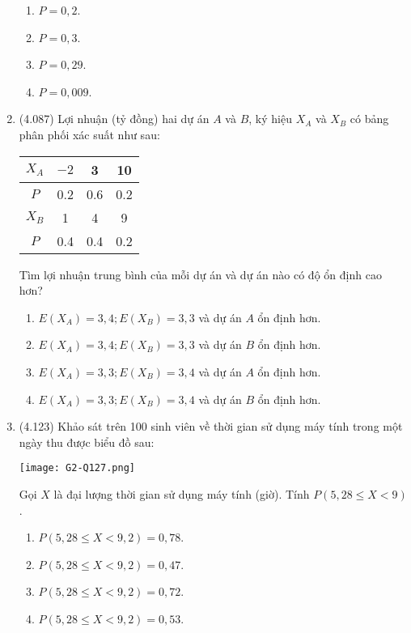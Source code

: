 \begin{enumerate}[label=\textbf{Câu \arabic*.},align=left,left=0cm..0cm,itemindent=*]
\begin{enumerate}[label=\textbf{\Alph*.},align=left,left=1cm..0cm,itemindent=*]
		\item $P=0,2$. \item $P=0,3$. \item $P=0,29$. \item $P=0,009$.
	\end{enumerate}
	\item (4.087) Lợi nhuận (tỷ đồng) hai dự án $A$ và $B$, ký hiệu $X_A$ và $X_B$ có bảng phân phối xác suất như sau:
	\begin{longtable}{|c|c|c|c|}\hline
	$X_A$ & $-2$ & 3   & 10  \\ \hline
	$P$   & 0.2  & 0.6 & 0.2 \\ \hline\hline
	$X_B$ & 1    & 4   & 9   \\ \hline
	$P$   & 0.4  & 0.4 & 0.2 \\ \hline
	\end{longtable}
	Tìm lợi nhuận trung bình của mỗi dự án và dự án nào có độ ổn định cao hơn?
	\begin{enumerate}[label=\textbf{\Alph*.},align=left,left=1cm..0cm,itemindent=*]
		\item $E\left( {{X}_{A}} \right)=3,4; E\left( {{X}_{B}} \right)=3,3$ và dự án $A$ ổn định hơn.
		\item $E\left( {{X}_{A}} \right)=3,4; E\left( {{X}_{B}} \right)=3,3$ và dự án $B$ ổn định hơn.
		\item $E\left( {{X}_{A}} \right)=3,3; E\left( {{X}_{B}} \right)=3,4$ và dự án $A$ ổn định hơn.
		\item $E\left( {{X}_{A}} \right)=3,3; E\left( {{X}_{B}} \right)=3,4$ và dự án $B$ ổn định hơn.
	\end{enumerate}
	\item (4.123) Khảo sát trên 100 sinh viên về thời gian sử dụng máy tính trong một ngày thu được biểu đồ sau:\par
	{\centering\texttt{[image: G2-Q127.png]}\par}
	Gọi $X$ là đại lượng thời gian sử dụng máy tính (giờ). Tính $P\left( 5,28\leqslant X<9 \right)$.
	\begin{enumerate}[label=\textbf{\Alph*.},align=left,left=1cm..0cm,itemindent=*]
		\item $P\left( 5,28\leqslant X<9,2 \right)=0,78$.
		\item $P\left( 5,28\leqslant X<9,2 \right)=0,47$.
		\item $P\left( 5,28\leqslant X<9,2 \right)=0,72$.
		\item $P\left( 5,28\leqslant X<9,2 \right)=0,53$.
	\end{enumerate}

\end{enumerate}
